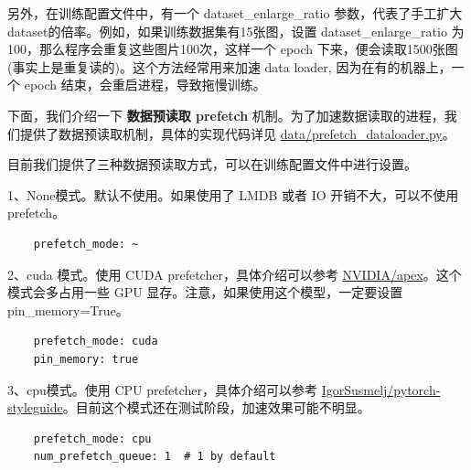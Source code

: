 \documentclass[../main.tex]{subfiles}
\begin{document}
    另外，在训练配置文件中，有一个 dataset\_enlarge\_ratio 参数，代表了手工扩大dataset的倍率。例如，如果训练数据集有15张图，设置 dataset\_enlarge\_ratio 为100，那么程序会重复这些图片100次，这样一个 epoch 下来，便会读取1500张图 (事实上是重复读的)。这个方法经常用来加速 data loader, 因为在有的机器上，一个 epoch 结束，会重启进程，导致拖慢训练。
    
    下面，我们介绍一下 \textbf{数据预读取 prefetch} 机制。为了加速数据读取的进程，我们提供了数据预读取机制，具体的实现代码详见 \href{https://github.com/XPixelGroup/BasicSR/blob/master/basicsr/data/prefetch_dataloader.py}{data/prefetch\_dataloader.py}。
    
    目前我们提供了三种数据预读取方式，可以在训练配置文件中进行设置。
    
    1、None模式。默认不使用。如果使用了 LMDB 或者 IO 开销不大，可以不使用 prefetch。
    \begin{verbatim}
    prefetch_mode: ~
    \end{verbatim}
    
    2、cuda 模式。使用 CUDA prefetcher，具体介绍可以参考 \href{https://github.com/NVIDIA/apex/issues/304#}{NVIDIA/apex}。这个模式会多占用一些 GPU 显存。注意，如果使用这个模型，一定要设置 pin\_memory=True。
    \begin{verbatim}
    prefetch_mode: cuda
    pin_memory: true
    \end{verbatim}
    
    3、cpu模式。使用 CPU prefetcher，具体介绍可以参考 \href{https://github.com/IgorSusmelj/pytorch-styleguide/issues/5#}{IgorSusmelj/pytorch-styleguide}。目前这个模式还在测试阶段，加速效果可能不明显。
    \begin{verbatim}
    prefetch_mode: cpu
    num_prefetch_queue: 1  # 1 by default
    \end{verbatim}
    
    
    
\end{document}
